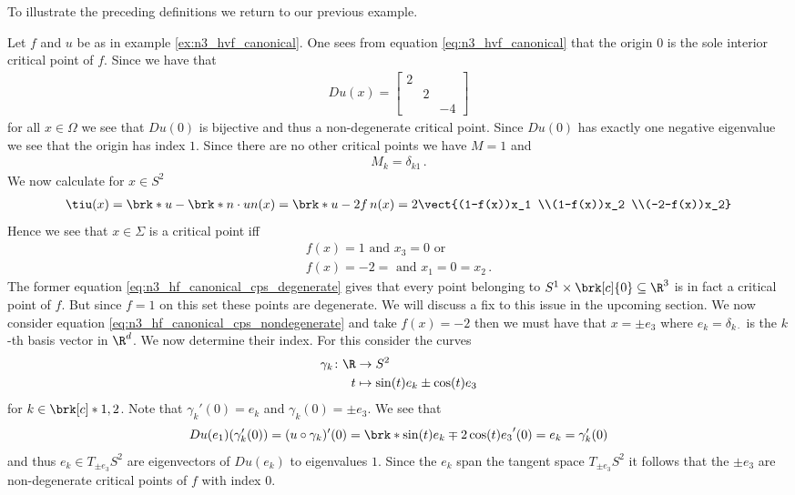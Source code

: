 To illustrate the preceding definitions we return to our previous example.
\begin{example}
  Let $f$ and $u$ be as in example \ref{ex:n3_hvf_canonical}. One sees from equation \eqref{eq:n3_hvf_canonical}
  that the origin $0$ is the sole interior critical point of $f$. Since we have that
  \begin{align*}
    Du(x) = \begin{bmatrix}
      2 & & \\
       & 2 & \\
      & & -4
    \end{bmatrix}
  \end{align*}
  for all $x\in\Omega$ we see that $Du(0)$ is bijective and thus a non-degenerate critical point. Since $Du(0)$ has
  exactly one negative eigenvalue we see that the origin has index $1$. Since there are no other critical points we have
  $M=1$ and
  \begin{align*}
    M_k=\delta_{k1}\,.
  \end{align*}
  We now calculate for $x\in S^2$
  \begin{align*}
    \tiu(x) = \brk*{u-\brk*{n\cdot u}n}(x)
    = \brk*{u-2f\,n}(x)
    = 2\vect{(1-f(x))x_1 \\(1-f(x))x_2 \\(-2-f(x))x_2}
  \end{align*}
  Hence we see that $x\in\Sigma$ is a critical point iff 
  \begin{align}
    f(x)=1 \text{ and }x_3=0\text{ or } \label{eq:n3_hf_canonical_cps_degenerate} \\
    f(x)=-2 = \text{ and }x_1=0=x_2\,. \label{eq:n3_hf_canonical_cps_nondegenerate}
  \end{align}
  The former equation \eqref{eq:n3_hf_canonical_cps_degenerate} gives that every
  point belonging to $S^1\times\brk[c]{0}\subseteq\R^3$ is in fact a critical point of $f$.
  But since $f=1$ on this set these points are degenerate.
  We will discuss a fix to this issue in the upcoming section.
  We now consider equation \eqref{eq:n3_hf_canonical_cps_nondegenerate} and take 
   $f(x)=-2$ then we must have that $x=\pm e_3$ where $e_k=\delta_{k\cdot}$
  is the $k$-th basis vector in $\R^d$. We now determine their index. For this consider the curves
  \begin{align*}
    \gamma_k\colon\R&\to S^2\\
    t&\mapsto \sin(t)e_k\pm\cos(t)e_3
  \end{align*}
  for $k\in\brk[c]*{1,2}$.
  Note that $\gamma_k'(0)=e_k$ and $\gamma_k(0)=\pm e_3$.
  We see that
  \begin{align*}
    Du(e_1)(\gamma_k'(0))=(u\circ\gamma_k)'(0)
    =\brk*{\sin(t)e_k\mp2\cos(t)e_3}'(0)
    =e_k=\gamma_k'(0)
  \end{align*}
  and thus $e_k\in T_{\pm e_3}S^2$ are eigenvectors of $Du(e_k)$ to eigenvalues $1$.
  Since the $e_k$ span the tangent space $T_{\pm e_3}S^2$ it follows that
  the $\pm e_3$ are non-degenerate critical points of $f$ with index $0$.
\end{example}

